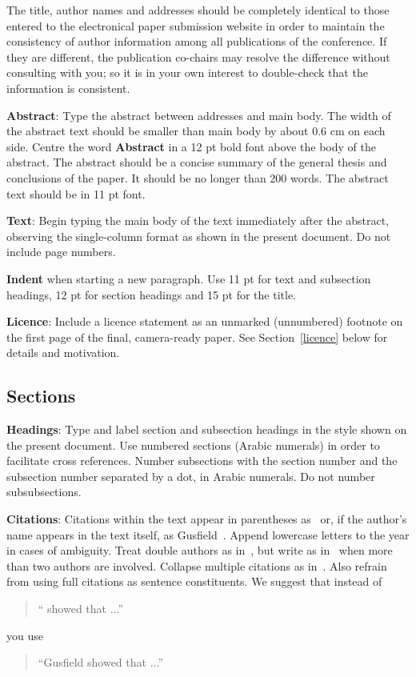 \documentclass[11pt]{article}
\begin{document}
The title, author names and addresses should be completely identical
to those entered to the electronical paper submission website in order
to maintain the consistency of author information among all
publications of the conference. If they are different, the publication
co-chairs may resolve the difference without consulting with you; so it
is in your own interest to double-check that the information is
consistent.

{\bf Abstract}: Type the abstract between addresses and main body.
The width of the abstract text should be
smaller than main body by about 0.6 cm on each side.
Centre the word {\bf Abstract} in a 12 pt bold
font above the body of the abstract. The abstract should be a concise
summary of the general thesis and conclusions of the paper. It should
be no longer than 200 words. The abstract text should be in 11 pt font.

{\bf Text}: Begin typing the main body of the text immediately after
the abstract, observing the single-column format as shown in 
the present document. Do not include page numbers.

{\bf Indent} when starting a new paragraph. Use 11 pt for text and 
subsection headings, 12 pt for section headings and 15 pt for
the title. 

{\bf Licence}: Include a licence statement as an unmarked (unnumbered)
footnote on the first page of the final, camera-ready paper.
See Section~\ref{licence} below for details and motivation.


\subsection{Sections}

{\bf Headings}: Type and label section and subsection headings in the
style shown on the present document.  Use numbered sections (Arabic
numerals) in order to facilitate cross references. Number subsections
with the section number and the subsection number separated by a dot,
in Arabic numerals. Do not number subsubsections.

{\bf Citations}: Citations within the text appear in parentheses
as~\cite{Gusfield:97} or, if the author's name appears in the text
itself, as Gusfield~.  Append lowercase letters
to the year in cases of ambiguity.  Treat double authors as
in~\cite{Aho:72}, but write as in~\cite{Chandra:81} when more than two
authors are involved. Collapse multiple citations as
in~\cite{Gusfield:97,Aho:72}. Also refrain from using full citations
as sentence constituents. We suggest that instead of
\begin{quote}
  ``\cite{Gusfield:97} showed that ...''
\end{quote}
you use
\begin{quote}
``Gusfield    showed that ...''
\end{quote}
\end{document}
